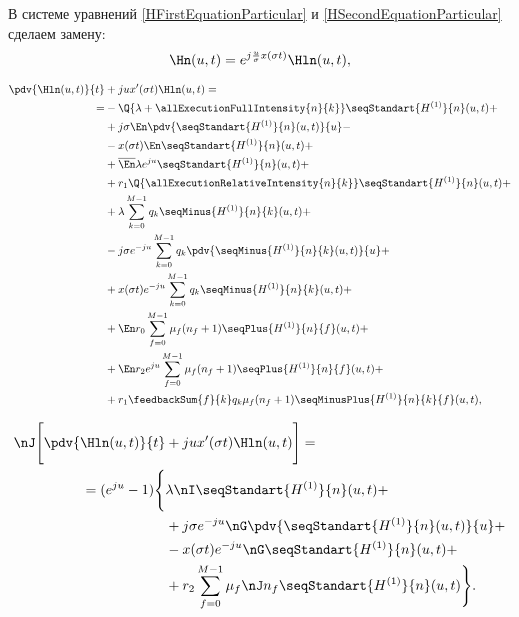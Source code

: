 В системе уравнений \eqref{HFirstEquationParticular} и \eqref{HSecondEquationParticular}
сделаем замену:
\begin{equation}
    \Hn(u,t) = e^{j \frac{u}{\sigma} x(\sigma t)}\Hln(u,t),
\end{equation}

\begin{equation*}\begin{aligned}
\pdv{\Hln(u,t)}{t} &+ jux'(\sigma t) \Hln (u,t)= \\
   =&-\Q{\lambda+\allExecutionFullIntensity{n}{k}}\seqStandart{H^{(1)}}{n}(u,t)+\\
    &+j \sigma \En \pdv{\seqStandart{H^{(1)}}{n}(u,t)}{u} - \\ 
    &-x(\sigma t) \En \seqStandart{H^{(1)}}{n}(u,t) + \\
    &+\overline{\En} \lambda e^{ju} \seqStandart{H^{(1)}}{n}(u,t)+\\
    &+r_1 \Q{\allExecutionRelativeIntensity{n}{k}} \seqStandart{H^{(1)}}{n}(u,t) + \\
    &+\lambda\sum_{k=0}^{M-1}q_k \seqMinus{H^{(1)}}{n}{k}(u,t) + \\
    &-j \sigma  e^{-ju} \sum_{k=0}^{M-1}q_k \pdv{\seqMinus{H^{(1)}}{n}{k}(u,t)}{u} + \\
    &+x(\sigma t)  e^{-ju} \sum_{k=0}^{M-1}q_k \seqMinus{H^{(1)}}{n}{k}(u,t) + \\
    &+\En r_0 \sum_{f=0}^{M-1} \mu_f (n_f + 1) \seqPlus{H^{(1)}}{n}{f}(u,t) + \\
    &+\En r_2 e^{ju} \sum_{f=0}^{M-1} \mu_f (n_f + 1) \seqPlus{H^{(1)}}{n}{f}(u,t) + \\
    &+r_1 \feedbackSum{f}{k}
        q_k \mu_f (n_f+1) \seqMinusPlus{H^{(1)}}{n}{k}{f}(u,t),
\end{aligned}\end{equation*}

\begin{equation*}\begin{aligned} 
\nJ \Bigg[ \pdv{\Hln(u,t)}{t} & + jux'(\sigma t) \Hln (u,t) \Bigg] = \\
=(e^{ju} - 1)
\Bigg\{
    &\lambda \nI \seqStandart{H^{(1)}}{n}(u,t)+\\
    &+j\sigma e^{-ju} \nG\pdv{\seqStandart{H^{(1)}}{n}(u,t)}{u} + \\
    &-x(\sigma t) e^{-ju} \nG \seqStandart{H^{(1)}}{n}(u,t) + \\
    &+r_2\sum_{f=0}^{M-1} \mu_f \nJ n_f \seqStandart{H^{(1)}}{n}(u,t)
\Bigg\}
.
\end{aligned}\end{equation*}

